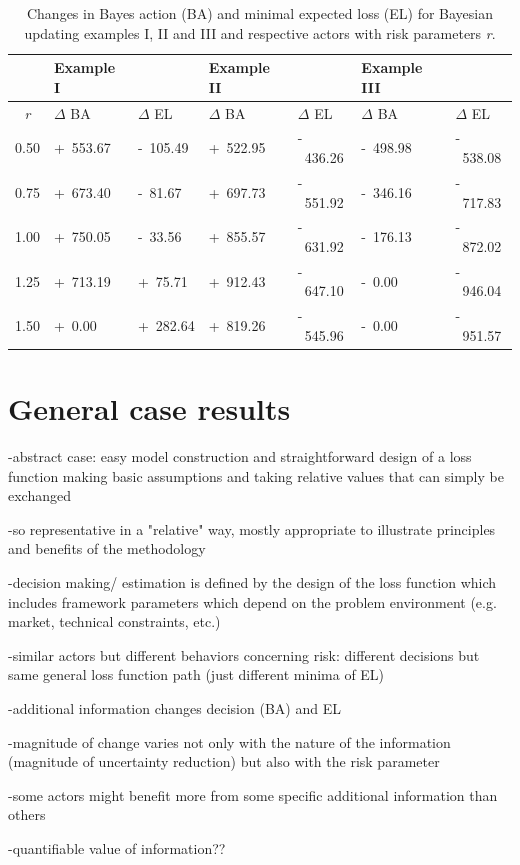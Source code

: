 	\begin{table}
		\centering
		\begin{tabular}[c]{| c || l | l || l | l || l | l |}
			\hline
			& Example I & & Example II & & Example III & \\
			\hline
			\hline
			\textit{r} & $\Delta$ BA & $\Delta$ EL & $\Delta$ BA & $\Delta$ EL & $\Delta$ BA & $\Delta$ EL\\ 
			\hline
			0.50 & +~553.67 & -~105.49 & +~522.95 & -~436.26 & -~498.98 & -~538.08 \\ 
			0.75 & +~673.40 & -~81.67 & +~697.73 & -~551.92 & -~346.16 & -~717.83  \\ 
			1.00 & +~750.05 & -~33.56 & +~855.57 & -~631.92 & -~176.13 & -~872.02 \\ 
			1.25 & +~713.19 & +~75.71 & +~912.43 & -~647.10 & -~0.00 & -~946.04 \\ 
			1.50 & +~0.00 & +~282.64 & +~819.26 & -~545.96 & -~0.00 & -~951.57  \\ 
			\hline
		\end{tabular}
		\caption{Changes in Bayes action (BA) and minimal expected loss (EL) for Bayesian updating examples I, II and III and respective actors with risk parameters \textit{r}.}
		\label{tab:update_examples_all}
	\end{table}
		
	\section{General case results}
	
	-abstract case: easy model construction and straightforward design of a loss function making basic assumptions and taking relative values that can simply be exchanged
	
	-so representative in a "relative" way, mostly appropriate to illustrate principles and benefits of the methodology
	
	-decision making/ estimation is defined by the design of the loss function which includes framework parameters which depend on the problem environment (e.g. market, technical constraints, etc.)
	
	-similar actors but different behaviors concerning risk: different decisions but same general loss function path (just different minima of EL)
	
	-additional information changes decision (BA) and EL
	
	-magnitude of change varies not only with the nature of the information (magnitude of uncertainty reduction) but also with the risk parameter
	
	-some actors might benefit more from some specific additional information than others
	
	-quantifiable value of information??